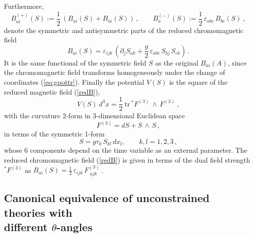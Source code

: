 \documentclass[a4paper,12pt]{article}
\begin{document}
Furthermore,
\begin{equation}
\label{symasymB}
B^{(+)}_{ai}(S) := \frac{1}{2}\,(B_{ai}(S) + B_{ia}(S))\,, \qquad
B^{(-)}_a (S):= \frac{1}{2}\,\varepsilon_{abc} \, B_{bc}(S)~,
\end{equation}
denote the symmetric and antisymmetric
parts of the reduced chromomagnetic field
\begin{equation}
\label{redB}
B_{ai}(S) = \varepsilon_{ijk}\,
\left(\partial_j S_{ak} + \frac{g}{2}\,
\varepsilon_{abc}\, S_{bj}\, S_{ck}\right)\,.
\end{equation}
It is the same functional of the symmetric field $S$ as the original
$B_{ai}(A)$, since the chromomagnetic field transforms homogeneously
under the change of coordinates (\ref{eq:gpottr}).
Finally the potential $V(S)$ is the square of the reduced magnetic field
(\ref{redB}),
\begin{equation}
\label{V(S)}
V(S)\ d^3x = \frac{1}{2} \ \mbox{tr}\,{}^\ast\! F^{(3)}\,\wedge \, F^{(3)}~,
\end{equation}
with the curvature 2-form in 3-dimensional Euclidean space
\begin{equation}
\label{3F}
 F^{(3)} = d S + S\, \wedge\, S\,,
\end{equation}
in terms of the symmetric 1-form
\begin{equation}
\label{3S}
S = g\tau_k\, S_{kl} \, dx_l, \qquad k, l = 1,2,3\,,
\end{equation}
whose 6 components depend on the time variable as an external parameter.
The reduced chromomagnetic field (\ref{redB}) is given in terms of the
dual field strength ${}^\ast\! F^{(3)}$ as
$B_{ai}(S) =\frac{1}{2}\, \varepsilon_{ijk}\, F^{(3)}_{\ ajk}\,$.


\subsection{Canonical equivalence of unconstrained theories with \\
 different $\theta$-angles}

\label{subsecIIB}
\end{document}
